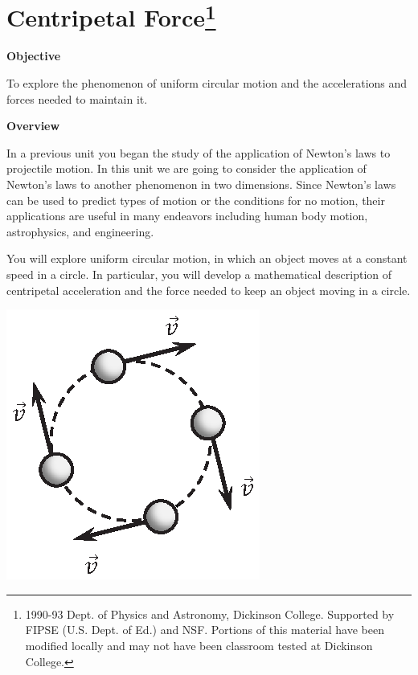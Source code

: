 
\section{Centripetal Force\footnote{
1990-93 Dept. of Physics and Astronomy, Dickinson College. Supported by FIPSE
(U.S. Dept. of Ed.) and NSF. Portions of this material have been modified locally
and may not have been classroom tested at Dickinson College.
}}

\makelabheader %

\bigskip\bigskip
\textbf{Objective} 

To explore the phenomenon of uniform circular motion and the accelerations and
forces needed to maintain it.

\textbf{Overview} 

In a previous unit you began the study of the application of Newton's laws to
projectile motion. In this unit we are going to consider the application of
Newton's laws to another phenomenon in two dimensions. Since Newton's laws can
be used to predict types of motion or the conditions for no motion, their applications
are useful in many endeavors including human body motion, astrophysics, and
engineering.

You will explore uniform circular motion, in which an object moves at a constant
speed in a circle. In particular, you will develop a mathematical description
of centripetal acceleration and the force needed to keep an object moving in
a circle.

\vspace{0.3cm}
{\par\centering \includegraphics{centripetal/centripetal_fig1_new.eps} \par}
\vspace{0.3cm}

